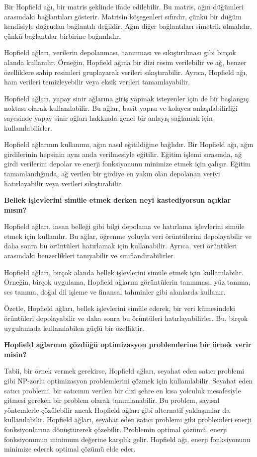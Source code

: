 \documentclass[11pt]{article}
\begin{document}
Bir Hopfield ağı, bir matris şeklinde ifade edilebilir. Bu matris, ağın düğümleri arasındaki bağlantıları gösterir. Matrisin köşegenleri sıfırdır, çünkü bir düğüm kendisiyle doğrudan bağlantılı değildir. Ağın diğer bağlantıları simetrik olmalıdır, çünkü bağlantılar birbirine bağımlıdır.

Hopfield ağları, verilerin depolanması, tanınması ve sıkıştırılması gibi birçok alanda kullanılır. Örneğin, Hopfield ağına bir dizi resim verilebilir ve ağ, benzer özelliklere sahip resimleri gruplayarak verileri sıkıştırabilir. Ayrıca, Hopfield ağı, ham verileri temizleyebilir veya eksik verileri tamamlayabilir.

Hopfield ağları, yapay sinir ağlarına giriş yapmak isteyenler için de bir başlangıç noktası olarak kullanılabilir. Bu ağlar, basit yapısı ve kolayca anlaşılabilirliği sayesinde yapay sinir ağları hakkında genel bir anlayış sağlamak için kullanılabilirler.

Hopfield ağlarının kullanımı, ağın nasıl eğitildiğine bağlıdır. Bir Hopfield ağı, ağın girdilerinin hepsinin aynı anda verilmesiyle eğitilir. Eğitim işlemi sırasında, ağ girdi verilerini depolar ve enerji fonksiyonunu minimize etmek için çalışır. Eğitim tamamlandığında, ağ verilen bir girdiye en yakın olan depolanan veriyi hatırlayabilir veya verileri sıkıştırabilir.

\textbf{Bellek işlevlerini simüle etmek derken neyi kastediyorsun açıklar mısın?}

Hopfield ağları, insan belleği gibi bilgi depolama ve hatırlama işlevlerini simüle etmek için kullanılır. Bu ağlar, öğrenme yoluyla veri örüntülerini depolayabilir ve daha sonra bu örüntüleri hatırlamak için kullanabilir. Ayrıca, veri örüntüleri arasındaki benzerlikleri tanıyabilir ve sınıflandırabilirler.

Hopfield ağları, birçok alanda bellek işlevlerini simüle etmek için kullanılabilir. Örneğin, birçok uygulama, Hopfield ağlarını görüntülerin tanınması, yüz tanıma, ses tanıma, doğal dil işleme ve finansal tahminler gibi alanlarda kullanır.

Özetle, Hopfield ağları, bellek işlevlerini simüle ederek, bir veri kümesindeki örüntüleri depolayabilir ve daha sonra bu örüntüleri hatırlayabilirler. Bu, birçok uygulamada kullanılabilen güçlü bir özelliktir.

\textbf{Hopfield ağlarının çözdüğü optimizasyon problemlerine bir örnek verir misin?}

Tabii, bir örnek vermek gerekirse, Hopfield ağları, seyahat eden satıcı problemi gibi NP-zorlu optimizasyon problemlerini çözmek için kullanılabilir. Seyahat eden satıcı problemi, bir satıcının verilen bir dizi şehre en kısa yolculuk mesafesiyle gitmesi gereken bir problem olarak tanımlanabilir. Bu problem, sayısal yöntemlerle çözülebilir ancak Hopfield ağları gibi alternatif yaklaşımlar da kullanılabilir. Hopfield ağları, seyahat eden satıcı problemi gibi problemleri enerji fonksiyonlarına dönüştürerek çözebilir. Problemin optimal çözümü, enerji fonksiyonunun minimum değerine karşılık gelir. Hopfield ağı, enerji fonksiyonunu minimize ederek optimal çözümü elde eder.
\end{document}
